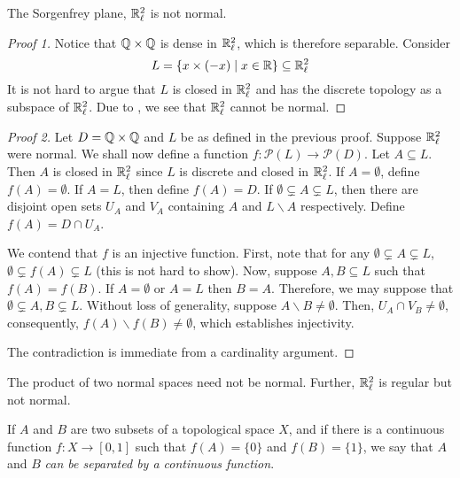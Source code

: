 \begin{proposition}
    The Sorgenfrey plane, $\mathbb{R}_\ell^2$ is not normal.
\end{proposition}
\begin{proof}[Proof 1]
    Notice that $\mathbb{Q}\times\mathbb{Q}$ is dense in $\mathbb{R}_\ell^2$, which is therefore separable. Consider 
    \begin{equation*}
        L = \{x\times(-x)\mid x\in\mathbb{R}\}\subseteq\mathbb{R}_\ell^2
    \end{equation*}
    It is not hard to argue that $L$ is closed in $\mathbb{R}_\ell^2$ and has the discrete topology as a subspace of $\mathbb{R}_\ell^2$. Due to , we see that $\mathbb{R}_\ell^2$ cannot be normal.
\end{proof}
\begin{proof}[Proof 2]
    Let $D = \mathbb{Q}\times\mathbb{Q}$ and $L$ be as defined in the previous proof. Suppose $\mathbb{R}_\ell^2$ were normal. We shall now define a function $f:\mathcal P(L)\to\mathcal P(D)$. Let $A\subseteq L$. Then $A$ is closed in $\mathbb{R}_\ell^2$ since $L$ is discrete and closed in $\mathbb{R}_\ell^2$. If $A = \emptyset$, define $f(A) = \emptyset$. If $A = L$, then define $f(A) = D$. If $\emptyset\subsetneq A\subsetneq L$, then there are disjoint open sets $U_A$ and $V_A$ containing $A$ and $L\backslash A$ respectively. Define $f(A) = D\cap U_A$. 

    We contend that $f$ is an injective function. First, note that for any $\emptyset\subsetneq A\subsetneq L$, $\emptyset\subsetneq f(A)\subsetneq L$ (this is not hard to show). Now, suppose $A,B\subseteq L$ such that $f(A) = f(B)$. If $A = \emptyset$ or $A = L$ then $B = A$. Therefore, we may suppose that $\emptyset\subsetneq A,B\subsetneq L$. Without loss of generality, suppose $A\backslash B\ne\emptyset$. Then, $U_A\cap V_B\ne\emptyset$, consequently, $f(A)\backslash f(B)\ne\emptyset$, which establishes injectivity.

    The contradiction is immediate from a cardinality argument.
\end{proof}

\begin{corollary}
    The product of two normal spaces need not be normal. Further, $\mathbb{R}_\ell^2$ is regular but not normal.
\end{corollary}

\begin{definition}
    If $A$ and $B$ are two subsets of a topological space $X$, and if there is a continuous function $f:X\to[0,1]$ such that $f(A) = \{0\}$ and $f(B) = \{1\}$, we say that $A$ and $B$ \textit{can be separated by a continuous function}.
\end{definition}

